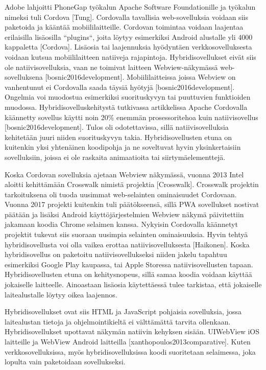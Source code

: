 \documentclass{tktltiki}
\begin{document}
Adobe lahjoitti PhoneGap työkalun Apache Software Foundationille ja työkalun nimeksi tuli Cordova [Tung]. Cordovalla tavallisia web-sovelluksia voidaan siis paketoida ja kääntää mobiililaitteille. Cordovan toimintaa voidaan laajentaa erilaisilla lisäosilla “plugins“, joita löytyy esimerkiksi Android alustalle yli 4000 kappaletta [Cordova]. Lisäosia tai laajennuksia hyödyntäen verkkosovelluksesta voidaan kutsua mobiililaitteen natiiveja rajapintoja. Hybridisovellukset eivät siis ole natiivisovelluksia, vaan ne toimivat laitteen Webview-näkymässä web-sovelluksena [bosnic2016development]. Mobiililaitteissa joissa Webview on vanhentunut ei Cordovalla saada täysiä hyötyjä [bosnic2016development]. Ongelmia voi muodostua esimerkiksi suorituskyvyn tai puuttuvien funktioiden muodossa. Hybridisovelluskehitystä tutkivassa artikkelissa Apache Cordovalla käännetty sovellus käytti noin 20\% enemmän prosessoritehoa kuin natiivisovellus [bosnic2016development]. Tulos oli odotettavissa, sillä natiivisovelluksia kehitetään juuri niiden suorituskyvyn takia. Hybridisovellusten etuna on kuitenkin yksi yhtenäinen koodipohja ja ne soveltuvat hyvin yksinkertaisiin sovelluksiin, joissa ei ole raskaita animaatioita tai siirtymäelementtejä. 

Koska Cordovan sovelluksia ajetaan Webview näkymässä, vuonna 2013 Intel aloitti kehittämään Crosswalk nimistä projektia [Crosswalk]. Crosswalk projektin tarkoituksena oli tuoda uusimmat web-selainten ominaisuudet Cordovaan. Vuonna 2017 projekti kuitenkin tuli päätökseensä, sillä PWA sovellukset nostivat päätään ja lisäksi Android käyttöjärjestelmien Webview näkymä päivitettiin jakamaan koodia Chrome selaimen kanssa. Nykyisin Cordovalla käännetyt projektit tukevat siis suoraan uusimpia selainten ominaisuuksia. Hyvin tehtyä hybridisovellusta voi olla vaikea erottaa natiivisovelluksesta [Haikonen]. Koska hybridisovellus on paketoitu natiivisovellukseksi niiden jakelu tapahtuu esimerkiksi Google Play kaupassa, tai Apple Storessa natiivisovellusten tapaan. Hybridisovellusten etuna on kehitysnopeus, sillä samaa koodia voidaan käyttää jokaiselle laitteelle. Ainoastaan lisäosia käytettäessä tulee tarkistaa, että jokaiselle laitealustalle löytyy oikea laajennos. 

Hybridisovellukset ovat siis HTML ja JavaScript pohjaisia sovelluksia, jossa laitealustan tietoja ja ohjelmointikieltä ei välttämättä tarvita ollenkaan. Hybridisovellukset upottavat näkymän natiivin kehyksen sisään. UIWebView iOS laitteille ja WebView Android laitteilla [xanthopoulos2013comparative]. Kuten verkkosovelluksissa, myös hybridisovelluksissa koodi suoritetaan selaimessa, joka lopulta vain paketoidaan sovellukseksi. 
\end{document}
